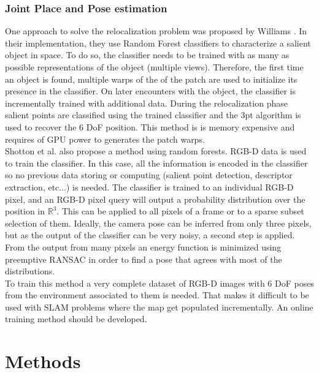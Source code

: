 \subsubsection{Joint Place and Pose estimation}
\label{ssub:joint_place_and_pose_estimaton}

One approach to solve the relocalization problem was proposed by Williams \cite{Williams2007}. In their implementation, they use Random Forest classifiers to characterize a salient object in space. To do so, the classifier needs to be trained with as many as possible representations of the object (multiple views). Therefore, the first time an object is found, multiple warps of the of the patch are used to initialize its presence in the classifier. On later encounters with the object, the classifier is incrementally trained with additional data. During the relocalization phase salient points are classified using the trained classifier and the 3pt algorithm is used to recover the 6 DoF position. This method is is memory expensive and requires of GPU power to generates the patch warps.\\

Shotton et al. \cite{Shotton2013} also propose a method using random forests. RGB-D data is used to train the classifier. In this case, all the information is encoded in the classifier so no previous data storing or computing (salient point detection, descriptor extraction, etc...) is needed. The classifier is trained to an individual RGB-D pixel, and an RGB-D pixel query will output a probability distribution over the position in $\mathbb{R}^3$. This can be applied to all pixels of a frame or to a sparse subset selection of them. Ideally, the camera pose can be inferred from only three pixels, but as the output of the classifier can be very noisy, a second step is applied. From the output from many pixels an energy function is minimized using preemptive RANSAC in order to find a pose that agrees with most of the distributions.\\

To train this method a very complete dataset of RGB-D images with 6 DoF poses from the environment associated to them is needed. That makes it difficult to be used with SLAM problems where the map get populated incrementally. An online training  method should be developed.\\


\section{Methods}
\label{sec:methods}


